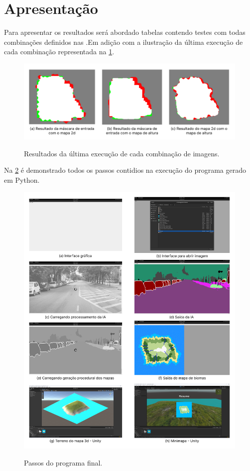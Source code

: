\section{Apresentação}

Para apresentar os resultados será abordado tabelas contendo testes com todas combinações definidos nas .Em adição com a ilustração da última  execução de cada combinação representada na \cref{fig:result_final}.



\begin{figure}[!ht]
	\centering
    \caption{Resultados da última execução de cada combinação de imagens.}
	\includegraphics[width=\textwidth]{figures/comb_results_final.png}
	\label{fig:result_final}
\end{figure}

Na \cref{fig:combs_result} é demonstrado todos os passos contidios na execução do programa gerado em Python.

\begin{figure}[!ht]
	\centering
    \caption{Passos do programa final.}
	\includegraphics[width=\textwidth]{figures/result_final.png}
	\label{fig:combs_result}
\end{figure}